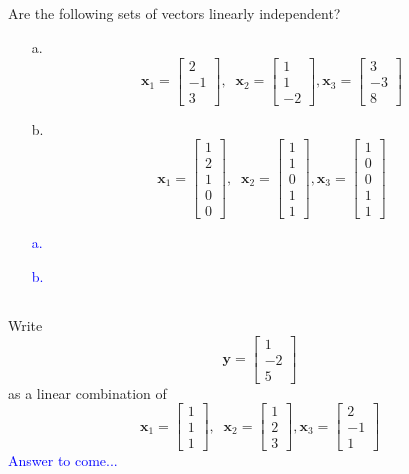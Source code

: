 \documentclass[a4paper,12pt]{article}
\newcommand{\M}[1]{ \begin{bmatrix} #1 \end{bmatrix} }
\newcommand{\vecx}{\textbf{x}}
\newcommand{\vecy}{\textbf{y}}
\begin{document}
\subsection{}
Are the following sets of vectors linearly independent?
\begin{itemize}
 \item [a.] $$\vecx_1 = \M{2\\-1\\3}, \;\; \vecx_2 = \M{1\\1\\-2}, \vecx_3 = \M{3\\-3\\8}$$
 \item [b.] $$\vecx_1 = \M{1\\2\\1\\0\\0}, \;\; \vecx_2 = \M{1\\1\\0\\1\\1}, \vecx_3 = \M{1\\0\\0\\1\\1}$$
\end{itemize}
\textcolor{blue}{
\begin{itemize}
 \item [a.] 
 \item [b.] 
\end{itemize}
}
\subsection{}
Write $$\vecy=\M{1\\-2\\5}$$ as a linear combination of $$\vecx_1 = \M{1\\1\\1}, \;\; \vecx_2 = \M{1\\2\\3}, \vecx_3 = \M{2\\-1\\1}$$
\textcolor{blue}{
Answer to come...
}
\end{document}
